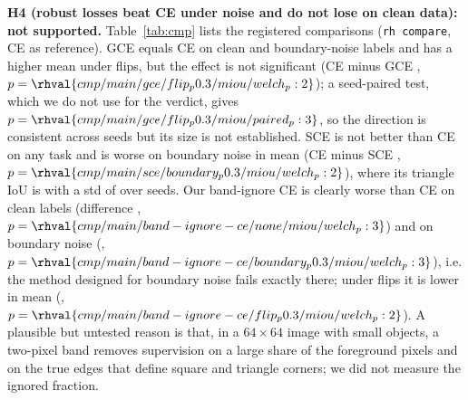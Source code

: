 \textbf{H4 (robust losses beat CE under noise and do not lose on clean data): not supported.} Table~\ref{tab:cmp} lists the registered comparisons (\texttt{rh compare}, CE as reference). GCE equals CE on clean and boundary-noise labels and has a higher mean under flips, but the effect is not significant (CE minus GCE , $p=\rhval{cmp/main/gce/flip_p0.3/miou/welch_p:2}$); a seed-paired test, which we do not use for the verdict, gives $p=\rhval{cmp/main/gce/flip_p0.3/miou/paired_p:3}$, so the direction is consistent across seeds but its size is not established. SCE is not better than CE on any task and is worse on boundary noise in mean (CE minus SCE , $p=\rhval{cmp/main/sce/boundary_p0.3/miou/welch_p:2}$), where its triangle IoU is  with a std of  over seeds. Our band-ignore CE is clearly worse than CE on clean labels (difference , $p=\rhval{cmp/main/band-ignore-ce/none/miou/welch_p:3}$) and on boundary noise (, $p=\rhval{cmp/main/band-ignore-ce/boundary_p0.3/miou/welch_p:3}$), i.e. the method designed for boundary noise fails exactly there; under flips it is lower in mean (, $p=\rhval{cmp/main/band-ignore-ce/flip_p0.3/miou/welch_p:2}$). A plausible but untested reason is that, in a $64\times64$ image with small objects, a two-pixel band removes supervision on a large share of the foreground pixels and on the true edges that define square and triangle corners; we did not measure the ignored fraction.

